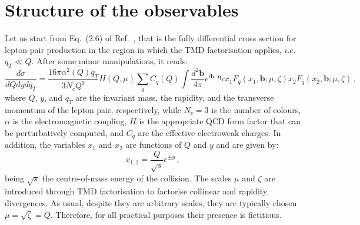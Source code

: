 \documentclass[10pt,a4paper]{article}
\begin{document}
\section{Structure of the observables}

Let us start from Eq.~(2.6) of Ref.~\cite{Scimemi:2017etj}, that is
the fully differential cross section for lepton-pair production in the
region in which the TMD factorisation applies, $i.e.$ $q_T \ll
Q$. After some minor manipulations, it reads:
\begin{equation}\label{eq:crosssection}
  \frac{d\sigma}{dQ dy dq_T} =
  \frac{16\pi\alpha^2(Q)q_T}{3N_c Q^3} H(Q,\mu) \sum_q C_q(Q)
  \int\frac{d^2\mathbf{b}}{4\pi} e^{i \mathbf{b}\cdot \mathbf{q}_T} x_1F_q(x_1,\mathbf{b};\mu,\zeta) x_2F_{\bar{q}}(x_2,\mathbf{b};\mu,\zeta)\,,
\end{equation}
where $Q$, $y$, and $q_T$ are the invariant mass, the rapidity, and
the transverse momentum of the lepton pair, respectively, while
$N_c=3$ is the number of colours, $\alpha$ is the electromagnetic
coupling, $H$ is the appropriate QCD form factor that can be
perturbatively computed, and $C_q$ are the effective electroweak
charges. In addition, the variables $x_1$ and $x_2$ are functions of
$Q$ and $y$ and are given by:
\begin{equation}\label{eq:Bjorkenx12}
  x_{1,2} = \frac{Q}{\sqrt{s}}e^{\pm y}\,,
\end{equation}
being $\sqrt{s}$ the centre-of-mass energy of the collision. The
scales $\mu$ and $\zeta$ are introduced through TMD factorisation to
factorise collinear and rapidity divergences. As usual, despite they
are arbitrary scales, they are typically chosen
$\mu=\sqrt{\zeta}=Q$. Therefore, for all practical purposes their
presence is fictitious.
\end{document}
